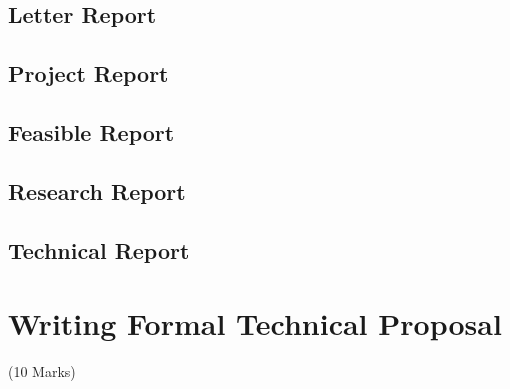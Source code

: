 \documentclass[12pt]{article}
\begin{document}
  \subsection{Letter Report}
  \subsection{Project Report}
  \subsection{Feasible Report}
  \subsection{Research Report}
  \subsection{Technical Report}

\pagebreak

\section{Writing Formal Technical Proposal}
  \begin{center}(10 Marks)\end{center}
\end{document}
